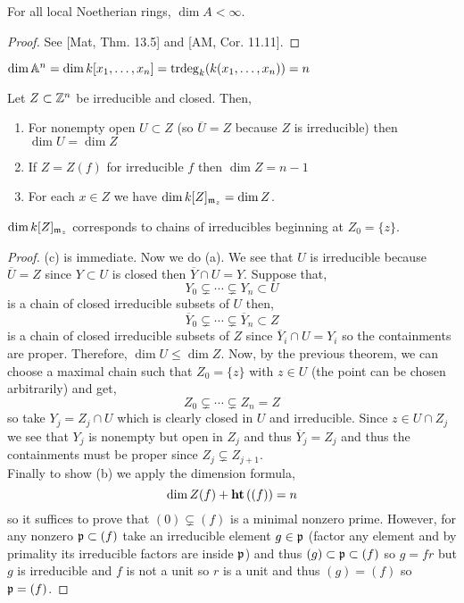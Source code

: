 \documentclass[12pt]{article}
\begin{document}
\begin{theorem}[Krull]
For all local Noetherian rings, $\dim{A} < \infty$.
\end{theorem}

\begin{proof}
See [Mat, Thm. 13.5] and [AM, Cor. 11.11].
\end{proof}

\begin{cor}
$\dim{\mathbb{A}^n} = \dim{k[x_1, \dots, x_n]} = \mathrm{trdeg}_{k}(k(x_1, \dots, x_n)) = n$
\end{cor}

\begin{cor}
Let $Z \subset \mathbb{Z}^n$ be irreducible and closed. Then,
\begin{enumerate}
\item For nonempty open $U \subset Z$ (so $\overline{U} = Z$ because $Z$ is irreducible) then $\dim{U} = \dim{Z}$
\item If $Z = Z(f)$ for irreducible $f$ then $\dim{Z} = n - 1$
\item For each $x \in Z$ we have $\dim{k[Z]_{\mathfrak{m}_z}} = \dim{Z}$.
\end{enumerate}
\end{cor}

\begin{rmk}
$\dim{k[Z]_{\mathfrak{m}_z}}$ corresponds to chains of irreducibles beginning at $Z_0 = \{ z \}$.
\end{rmk}

\begin{proof}
(c) is immediate. Now we do (a). We see that $U$ is irreducible because $\overline{U} = Z$ since $Y \subset U$ is closed then $\overline{Y} \cap U = Y$. Suppose that,
\[ Y_0 \subsetneq \cdots \subsetneq Y_n \subset U \]
is a chain of closed irreducible subsets of $U$ then,
\[ \overline{Y}_0 \subsetneq \cdots \subsetneq \overline{Y}_n \subset Z \]
is a chain of closed irreducible subsets of $Z$ since $\overline{Y}_i \cap U = Y_i$ so the containments are proper. Therefore, $\dim{U} \le \dim{Z}$. Now, by the previous theorem, we can choose a maximal chain such that $Z_0 = \{ z \}$ with $z \in U$ (the point can be chosen arbitrarily) and get,
\[ Z_0 \subsetneq \cdots \subsetneq Z_n = Z \]
so take $Y_j = Z_j \cap U$ which is clearly closed in $U$ and irreducible. Since $z \in U \cap Z_j$ we see that $Y_j$ is nonempty but open in $Z_j$ and thus $\overline{Y}_j = Z_j$ and thus the containments must be proper since $Z_j \subsetneq Z_{j+1}$. 
\bigskip\\
Finally to show (b) we apply the dimension formula,
\[ \dim{Z(f)} + \mathbf{ht}\left( (f) \right) = n \]
so it suffices to prove that $(0) \subsetneq (f)$ is a minimal nonzero prime. However, for any nonzero $\mathfrak{p} \subset (f)$ take an irreducible element $g \in \mathfrak{p}$ (factor any element and by primality its irreducible factors are inside $\mathfrak{p}$) and thus $(g) \subset \mathfrak{p} \subset (f)$ so $g = fr$ but $g$ is irreducible and $f$ is not a unit so $r$ is a unit and thus $(g) = (f)$ so $\mathfrak{p} = (f)$.
\end{proof}
\end{document}
